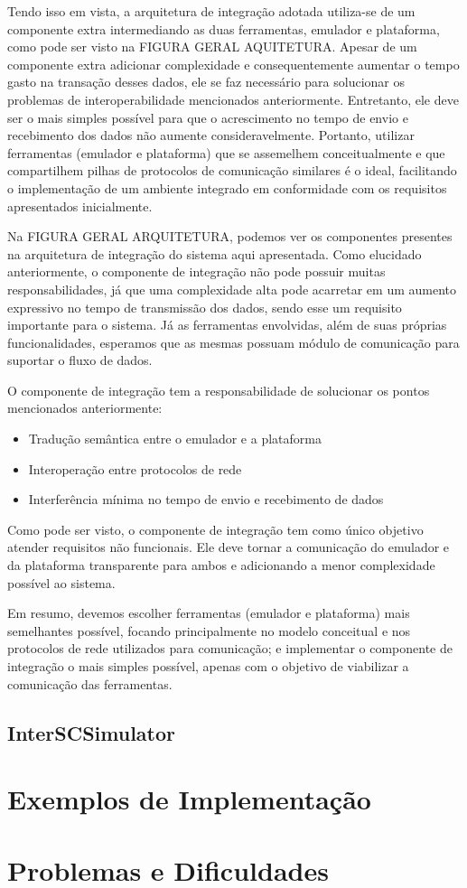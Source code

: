 Tendo isso em vista, a arquitetura de integração adotada utiliza-se de um componente extra intermediando as duas ferramentas, emulador e plataforma, como pode ser visto na
FIGURA GERAL AQUITETURA.
Apesar de um componente extra adicionar complexidade e consequentemente aumentar o tempo gasto na transação desses dados, ele se faz necessário para solucionar os problemas
de interoperabilidade mencionados anteriormente.
Entretanto, ele deve ser o mais simples possível para que o acrescimento no tempo de envio e recebimento dos dados não aumente consideravelmente.
Portanto, utilizar ferramentas (emulador e plataforma) que se assemelhem conceitualmente e que compartilhem pilhas de protocolos de comunicação similares é o ideal,
facilitando o implementação de um ambiente integrado em conformidade com os requisitos apresentados inicialmente.

Na FIGURA GERAL ARQUITETURA, podemos ver os componentes presentes na arquitetura de integração do sistema aqui apresentada.
Como elucidado anteriormente, o componente de integração não pode possuir muitas responsabilidades, já que uma complexidade alta pode acarretar em um aumento expressivo no
tempo de transmissão dos dados, sendo esse um requisito importante para o sistema.
Já as ferramentas envolvidas, além de suas próprias funcionalidades, esperamos que as mesmas possuam módulo de comunicação para suportar o fluxo de dados.

O componente de integração tem a responsabilidade de solucionar os pontos mencionados anteriormente:

\begin{itemize}
    \item Tradução semântica entre o emulador e a plataforma

    \item Interoperação entre protocolos de rede

    \item Interferência mínima no tempo de envio e recebimento de dados
\end{itemize}

Como pode ser visto, o componente de integração tem como único objetivo atender requisitos não funcionais.
Ele deve tornar a comunicação do emulador e da plataforma transparente para ambos e adicionando a menor complexidade possível ao sistema.

Em resumo, devemos escolher ferramentas (emulador e plataforma) mais semelhantes possível, focando principalmente no modelo conceitual e nos protocolos de rede utilizados para
comunicação; e implementar o componente de integração o mais simples possível, apenas com o objetivo de viabilizar a comunicação das ferramentas.

\subsection{InterSCSimulator}

\section{Exemplos de Implementação}
\section{Problemas e Dificuldades}
